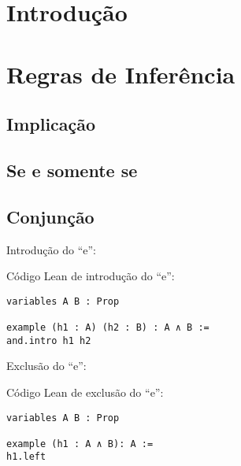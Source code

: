 \section{Introdução}

\section{Regras de Inferência}

\subsection{Implicação} 
\subsection{Se e somente se}

\subsection{Conjunção}

Introdução do ``e'':
 \begin{prooftree}
\end{prooftree}



Código Lean de introdução do ``e'':
\begin{lstlisting} 
variables A B : Prop

example (h1 : A) (h2 : B) : A ∧ B :=
and.intro h1 h2
\end{lstlisting}


Exclusão do ``e'':
 \begin{prooftree}
\end{prooftree}

Código Lean de exclusão do ``e'': 
\begin{lstlisting} 
variables A B : Prop

example (h1 : A ∧ B): A :=
h1.left
\end{lstlisting}

